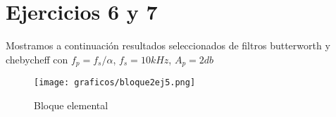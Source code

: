 \documentclass[assd_tp3_main.tex]{subfiles}
\begin{document}
\section*{Ejercicios 6 y 7}
Mostramos a continuación resultados seleccionados de filtros butterworth y chebycheff con
$f_p=f_s/\alpha$, $f_s=10kHz$, $A_p=2db$

\begin{figure}[H]	
	\centering
	\texttt{[image: graficos/bloque2ej5.png]}
	\caption{Bloque elemental}
	\label{fig:bloqueElemental}
\end{figure}
\end{document}
